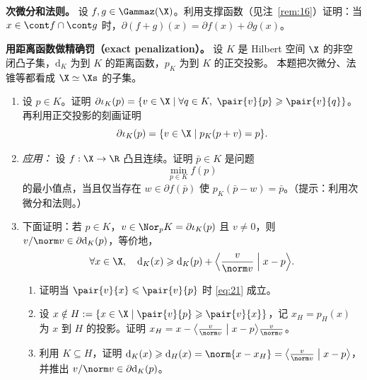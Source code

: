 \begin{exercise}[原讲义 B.3 练习 22]
\label{exo:B3-22}
\textbf{次微分和法则。} 设 $f,g\in\Gammaz(\X)$。利用支撑函数（见注~\ref{rem:16}）证明：当 $x\in\cont f\cap\cont g$ 时，$\partial(f+g)(x)=\partial f(x)+\partial g(x)$。
\end{exercise}

\begin{exercise}[原讲义 B.3 练习 23]
\label{exo:B3-23}
\textbf{用距离函数做精确罚（exact penalization）。} 设 $K$ 是 Hilbert 空间 $\X$ 的非空闭凸子集，$\mathrm d_K$ 为到 $K$ 的距离函数，$p_K$ 为到 $K$ 的正交投影。
本题把次微分、法锥等都看成 $\X\simeq\Xs$ 的子集。
\begin{enumerate}[label=\arabic*.]
  \item 设 $p\in K$。证明 $\partial\iota_K(p)=\{v\in\X\mid\forall q\in K,\ \pair{v}{p}\geqslant\pair{v}{q}\}$。再利用正交投影的刻画证明
        \begin{equation}
          \partial\iota_K(p)=\{v\in\X\mid p_K(p+v)=p\}.
          \label{eq:19}
        \end{equation}
  \item \emph{应用：} 设 $f:\X\to\R$ 凸且连续。证明 $\bar p\in K$ 是问题
        \begin{equation}
          \min_{p\in K}f(p)
          \label{eq:20}
        \end{equation}
        的最小值点，当且仅当存在 $w\in\partial f(\bar p)$ 使 $p_K(\bar p-w)=\bar p$。（提示：利用次微分和法则。）
  \item 下面证明：若 $p\in K$，$v\in\Nor_pK=\partial\iota_K(p)$ 且 $v\neq0$，则 $v/\norm v\in\partial\mathrm d_K(p)$，等价地，
        \begin{equation}
          \forall x\in\X,\quad\mathrm d_K(x)\geqslant\mathrm d_K(p)+\Bigl\langle\frac{v}{\norm v}\Bigm| x-p\Bigr\rangle .
          \label{eq:21}
        \end{equation}
        \begin{enumerate}[label=\alph*.]
          \item 证明当 $\pair{v}{x}\leqslant\pair{v}{p}$ 时 \eqref{eq:21} 成立。
          \item 设 $x\notin H:=\{x\in\X\mid\pair{v}{p}\geqslant\pair{v}{x}\}$，记 $x_H=p_H(x)$ 为 $x$ 到 $H$ 的投影。证明
                $x_H=x-\bigl\langle\frac{v}{\norm v}\bigm| x-p\bigr\rangle\frac{v}{\norm v}$。
          \item 利用 $K\subseteq H$，证明 $\mathrm d_K(x)\geqslant\mathrm d_H(x)=\norm{x-x_H}=\bigl\langle\frac{v}{\norm v}\bigm| x-p\bigr\rangle$，并推出 $v/\norm v\in\partial\mathrm d_K(p)$。

\end{enumerate}
\end{enumerate}
\end{exercise}
